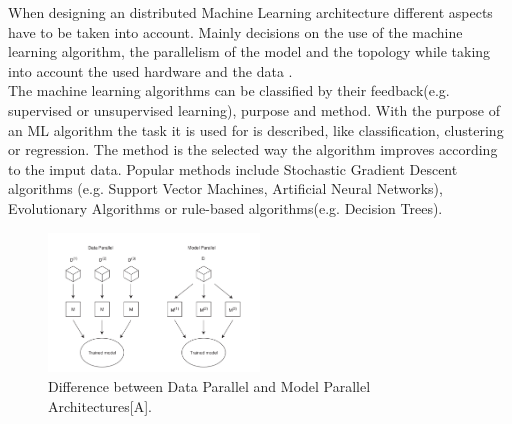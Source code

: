 When designing an distributed Machine Learning architecture different aspects have to be taken into account. Mainly decisions on the use of the machine learning algorithm, the parallelism of the model and the topology while taking into account the used hardware and the data \cite{DBLP}. \\

The machine learning algorithms can be classified by their feedback(e.g. supervised or unsupervised learning), purpose and method. With the purpose of an ML algorithm the task it is used for is described, like classification, clustering or regression. The method is the selected way the algorithm improves according to the imput data. Popular methods include Stochastic Gradient Descent algorithms (e.g. Support Vector Machines, Artificial Neural Networks), Evolutionary Algorithms or rule-based algorithms(e.g. Decision Trees).  \\

\begin{figure}
	\centering
	\includegraphics[width=0.5\textwidth]{scalingout.PNG}
	\caption{Difference between Data Parallel and Model Parallel Architectures[A].}
	\label{fig:Parallel}
\end{figure}

